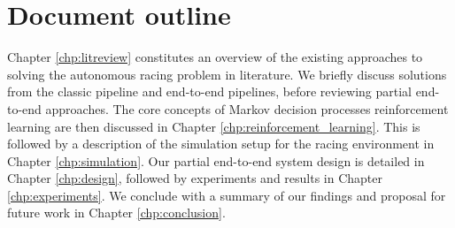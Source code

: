 \section{Document outline}
\label{sec:outline}

Chapter \ref{chp:litreview} constitutes an overview of the existing approaches to solving the autonomous racing problem in literature. 
We briefly discuss solutions from the classic pipeline and end-to-end pipelines, before reviewing partial end-to-end approaches. 
The core concepts of Markov decision processes reinforcement learning are then discussed in Chapter \ref{chp:reinforcement_learning}.
This is followed by a description of the simulation setup for the racing environment in Chapter \ref{chp:simulation}.
Our partial end-to-end system design is detailed in Chapter \ref{chp:design}, followed by experiments and results in Chapter \ref{chp:experiments}. 
We conclude with a summary of our findings and proposal for future work in Chapter \ref{chp:conclusion}.